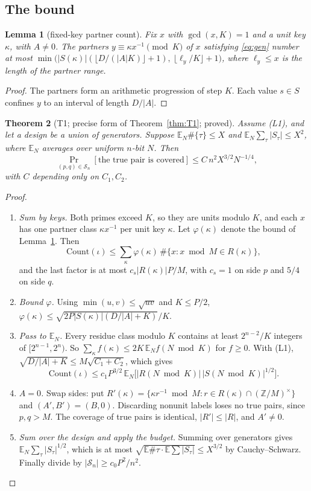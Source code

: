 \documentclass[11pt]{amsart}
\newtheorem{theorem}{Theorem}[section]
\newtheorem{lemma}[theorem]{Lemma}
\theoremstyle{definition}
\newcommand{\Z}{\mathbb{Z}}
\newcommand{\Sn}{\mathcal{S}_n}
\begin{document}
\subsection{The bound}

\begin{lemma}[fixed-key partner count]\label{lem:partner}
Fix $x$ with $\gcd(x,K)=1$ and a unit key $\kappa$, with $A\ne0$. The partners $y\equiv\kappa x^{-1}\pmod K$ of $x$
satisfying \eqref{eq:gen} number at most
$\min\bigl(|S(\kappa)|(\lfloor D/(|A|K)\rfloor+1),\ \lfloor\ell_y/K\rfloor+1\bigr)$, where
$\ell_y\le x$ is the length of the partner range.
\end{lemma}
\begin{proof}
The partners form an arithmetic progression of step $K$. Each value $s\in S$ confines $y$ to an
interval of length $D/|A|$.
\end{proof}

\begin{theorem}[T1; precise form of Theorem~\ref{thm:T1}; proved]\label{thm:T1precise}
Assume (L1), and let a design be a union of generators. Suppose
$\mathbb E_N\#\{\tau\}\le X$ and $\mathbb E_N\sum_\tau|S_\tau|\le X^2$, where $\mathbb E_N$
averages over uniform $n$-bit $N$. Then
\[
  \Pr_{(p,q)\in\Sn}[\text{the true pair is covered}]\le C\,n^2X^{3/2}N^{-1/4},
\]
with $C$ depending only on $C_1,C_2$.
\end{theorem}
\begin{proof}
\begin{enumerate}[label=\arabic*.]
\item \emph{Sum by keys.} Both primes exceed $K$, so they are units modulo $K$, and each $x$ has
  one partner class $\kappa x^{-1}$ per unit key $\kappa$. Let $\varphi(\kappa)$ denote the bound
  of Lemma~\ref{lem:partner}. Then
  \[
  \mathrm{Count}(\iota)\le\sum_\kappa\varphi(\kappa)\,\#\{x:x\bmod M\in R(\kappa)\},
  \]
  and the last factor is at most $c_s|R(\kappa)|P/M$, with $c_s=1$ on side $p$ and $5/4$ on side
  $q$.
\item \emph{Bound $\varphi$.} Using $\min(u,v)\le\sqrt{uv}$ and $K\le P/2$,
  $\varphi(\kappa)\le\sqrt{2P|S(\kappa)|(D/|A|+K)}/K$.
\item \emph{Pass to $\mathbb E_N$.} Every residue class modulo $K$ contains at least
  $2^{n-2}/K$ integers of $[2^{n-1},2^n)$. So $\sum_\kappa f(\kappa)\le2K\,\mathbb E_Nf(N\bmod
  K)$ for $f\ge0$. With (L1), $\sqrt{D/|A|+K}\le M\sqrt{C_1+C_2}$, which gives
  \[
  \mathrm{Count}(\iota)\le c_1P^{3/2}\,\mathbb E_N\bigl[|R(N\bmod K)|\,|S(N\bmod K)|^{1/2}\bigr].
  \]
\item \emph{$A=0$.} Swap sides: put $R'(\kappa)=\{\kappa r^{-1}\bmod M:r\in
  R(\kappa)\cap(\Z/M)^\times\}$ and $(A',B')=(B,0)$. Discarding nonunit labels loses no true
  pairs, since $p,q>M$. The coverage of true pairs is identical, $|R'|\le|R|$, and $A'\ne0$.
\item \emph{Sum over the design and apply the budget.} Summing over generators gives
  $\mathbb E_N\sum_\tau|S_\tau|^{1/2}$, which is at most
  $\sqrt{\mathbb E\#\tau\cdot\mathbb E\sum|S_\tau|}\le X^{3/2}$ by Cauchy--Schwarz. Finally
  divide by $|\Sn|\ge c_0P^2/n^2$.
\end{enumerate}
\end{proof}
\end{document}
